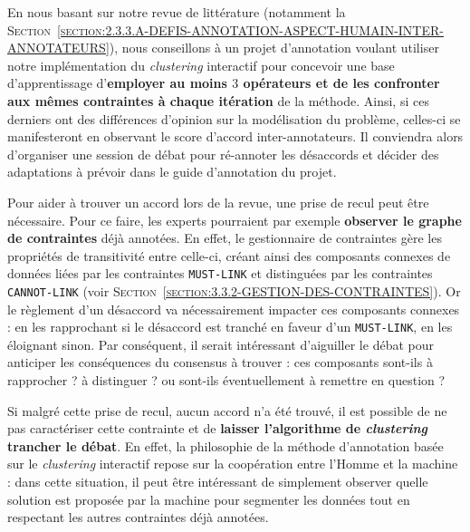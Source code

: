 			En nous basant sur notre revue de littérature (notamment la \textsc{Section~\ref{section:2.3.3.A-DEFIS-ANNOTATION-ASPECT-HUMAIN-INTER-ANNOTATEURS}}), nous conseillons à un projet d'annotation voulant utiliser notre implémentation du \textit{clustering} interactif pour concevoir une base d'apprentissage d'\textbf{employer au moins $3$ opérateurs et de les confronter aux mêmes contraintes à chaque itération} de la méthode.
			Ainsi, si ces derniers ont des différences d'opinion sur la modélisation du problème, celles-ci se manifesteront en observant le score d'accord inter-annotateurs.
			Il conviendra alors d'organiser une session de débat pour ré-annoter les désaccords et décider des adaptations à prévoir dans le guide d'annotation du projet.
			\begin{leftBarIdea}
				Pour aider à trouver un accord lors de la revue, une prise de recul peut être nécessaire.
				Pour ce faire, les experts pourraient par exemple \textbf{observer le graphe de contraintes} déjà annotées.
				En effet, le gestionnaire de contraintes gère les propriétés de transitivité entre celle-ci, créant ainsi des composants connexes de données liées par les contraintes \texttt{MUST-LINK} et distinguées par les contraintes \texttt{CANNOT-LINK} (voir \textsc{Section~\ref{section:3.3.2-GESTION-DES-CONTRAINTES}}).
				Or le règlement d'un désaccord va nécessairement impacter ces composants connexes : en les rapprochant si le désaccord est tranché en faveur d'un \texttt{MUST-LINK}, en les éloignant sinon.
				Par conséquent, il serait intéressant d'aiguiller le débat pour anticiper les conséquences du consensus à trouver : ces composants sont-ils à rapprocher ? à distinguer ? ou sont-ils 
				éventuellement à remettre en question ?

				Si malgré cette prise de recul, aucun accord n'a été trouvé, il est possible de ne pas caractériser cette contrainte et de \textbf{laisser l'algorithme de \textit{clustering} trancher le débat}.
				En effet, la philosophie de la méthode d'annotation basée sur le \textit{clustering} interactif repose sur la coopération entre l'Homme et la machine : dans cette situation, il peut être intéressant de simplement observer quelle solution est proposée par la machine pour segmenter les données tout en respectant les autres contraintes déjà annotées.
			\end{leftBarIdea}
			
